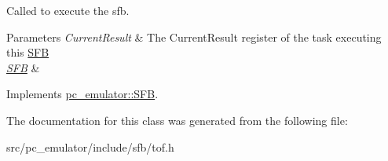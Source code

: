 Called to execute the sfb. 


\begin{DoxyParams}{Parameters}
{\em Current\+Result} & The Current\+Result register of the task executing this \hyperlink{classpc__emulator_1_1SFB}{S\+FB} \\
\hline
{\em \hyperlink{classpc__emulator_1_1SFB}{S\+FB}} & \\
\hline
\end{DoxyParams}


Implements \hyperlink{classpc__emulator_1_1SFB_a203227dee0fcab88b8e9d1055c29d958}{pc\+\_\+emulator\+::\+S\+FB}.



The documentation for this class was generated from the following file\+:\begin{DoxyCompactItemize}
\item 
src/pc\+\_\+emulator/include/sfb/tof.\+h\end{DoxyCompactItemize}
